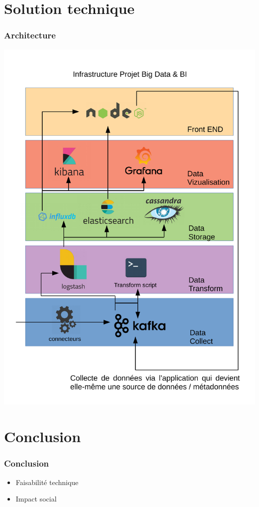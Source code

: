 \documentclass{beamer}
\begin{document}
\section{Solution technique}
\begin{frame}
  \frametitle{Architecture}
  \begin{center}
    \includegraphics[scale=0.25]{../pdfinc/SchemaInfra.pdf}
  \end{center}
\end{frame}

\section{Conclusion}
\begin{frame}
  \frametitle{Conclusion}
  \begin{itemize}
  \item Faisabilité technique
  \item Impact social
  \end{itemize}
\end{frame}
\end{document}
